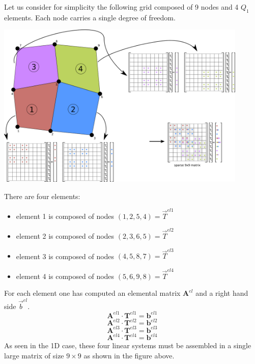 Let us consider for simplicity the following grid composed of 9 nodes and 4 $Q_1$ elements. 
Each node carries a single degree of freedom. 

\begin{center}
\includegraphics[width=12cm]{images/assembly/assembly.png} 
\end{center}

There are four elements:
\begin{itemize}
\item element 1 is composed of nodes $(1,2,5,4)={\vec T}^{el1}$
\item element 2 is composed of nodes $(2,3,6,5)={\vec T}^{el2}$
\item element 3 is composed of nodes $(4,5,8,7)={\vec T}^{el3}$
\item element 4 is composed of nodes $(5,6,9,8)={\vec T}^{el4}$
\end{itemize}
For each element one has computed an elemental matrix ${\bm A}^{el}$ and a right hand side ${\vec b}^{el}$. 
\[
{\bm A}^{el1} \cdot {\bm T}^{el1} = {\bm b}^{el1}
\]
\[
{\bm A}^{el2} \cdot {\bm T}^{el2} = {\bm b}^{el2}
\]
\[
{\bm A}^{el3} \cdot {\bm T}^{el3} = {\bm b}^{el3}
\]
\[
{\bm A}^{el4} \cdot {\bm T}^{el4} = {\bm b}^{el4}
\]
As seen in the 1D case, these four linear systems must be assembled in a single large matrix of size 
$9\times 9$ as shown in the figure above.

